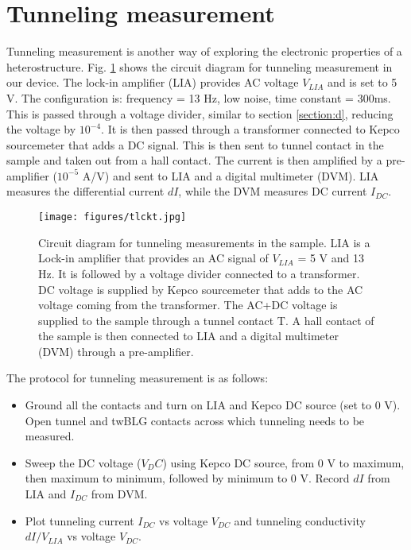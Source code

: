 \section{Tunneling measurement}
\label{section:z}
Tunneling measurement is another way of exploring the electronic properties of a heterostructure. Fig. \ref{fig:tlckt} shows the circuit diagram for tunneling measurement in our device. The lock-in amplifier (LIA) provides AC voltage $V_{LIA}$ and is set to 5 V. The configuration is: frequency = 13 Hz, low noise, time constant = 300ms. This is passed through a voltage divider, similar to section \ref{section:d}, reducing the voltage by $10^{-4}$. It is then passed through a transformer connected to Kepco sourcemeter that adds a DC signal. This is then sent to tunnel contact in the sample and taken out from a hall contact. The current is then amplified by a pre-amplifier ($10^{-5}$ A/V) and sent to LIA and a digital multimeter (DVM). LIA measures the differential current $dI$, while the DVM measures DC current $I_{DC}$.

\begin{figure}[H]
	\centering
	\texttt{[image: figures/tlckt.jpg]}
	\caption{Circuit diagram for tunneling measurements in the sample. LIA is a Lock-in amplifier that provides an AC signal of $V_{LIA}$ = 5 V and 13 Hz. It is followed by a voltage divider connected to a transformer. DC voltage is supplied by Kepco sourcemeter that adds to the AC voltage coming from the transformer. The AC+DC voltage is supplied to the sample through a tunnel contact T. A hall contact of the sample is then connected to LIA and a digital multimeter (DVM) through a pre-amplifier.}
	\label{fig:tlckt}
\end{figure}

The protocol for tunneling measurement is as follows:

\begin{itemize}
	\item Ground all the contacts and turn on LIA and Kepco DC source (set to 0 V). Open tunnel and twBLG contacts across which tunneling needs to be measured.
	\item Sweep the DC voltage ($V_DC$) using Kepco DC source, from 0 V to maximum, then maximum to minimum, followed by minimum to 0 V. Record $dI$ from LIA and $I_{DC}$ from DVM.
	\item Plot tunneling current $I_{DC}$ vs voltage $V_{DC}$ and tunneling conductivity $dI/V_{LIA}$ vs voltage $V_{DC}$.
\end{itemize}

